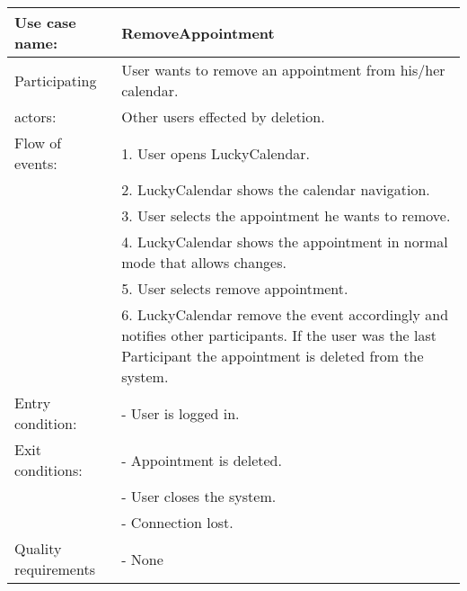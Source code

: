 {\tabulinesep=1.2mm
\begin{tabu}{ | p{3cm} | p{13cm} |}
    \hline
    Use case name: 			& 		RemoveAppointment\\ \hline
    Participating  			& 		User wants to remove an appointment from his/her calendar. \\
    actors:					&		Other users effected by deletion.\\ \hline
    Flow of events: 		& 		1. User opens LuckyCalendar. \\
							&		2. LuckyCalendar shows the calendar navigation.\\
							&		3. User selects the appointment he wants to remove.\\
							&		4. LuckyCalendar shows the appointment in normal mode that allows changes.\\
							&		5. User selects remove appointment.\\
							&		6. LuckyCalendar remove the event accordingly and notifies other participants. If the user was the last Participant the appointment is deleted from the system.\\\hline
    Entry condition: 		& 		- User is logged in.  \\ \hline
	Exit conditions: 		&		- Appointment is deleted.\\
							&		- User closes the system.\\
							&		- Connection lost.\\\hline
	Quality requirements	&	 	- None \\\hline
\end{tabu}
}